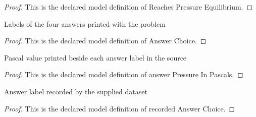 \begin{proof}
  This is the declared model definition of Reaches Pressure Equilibrium.
\end{proof}
\begin{definition}
  \label{def:physics:phyx-mini-0376:phyxminiproblems-problemphyxmini0376-answerchoice}
  Labels of the four answers printed with the problem
\end{definition}
\begin{proof}
  This is the declared model definition of Answer Choice.
\end{proof}
\begin{definition}
  \label{def:physics:phyx-mini-0376:phyxminiproblems-problemphyxmini0376-answerpressureinpascals}
  Pascal value printed beside each answer label in the source
\end{definition}
\begin{proof}
  This is the declared model definition of answer Pressure In Pascals.
\end{proof}
\begin{definition}
  \label{def:physics:phyx-mini-0376:phyxminiproblems-problemphyxmini0376-recordedanswerchoice}
  Answer label recorded by the supplied dataset
\end{definition}
\begin{proof}
  This is the declared model definition of recorded Answer Choice.
\end{proof}
